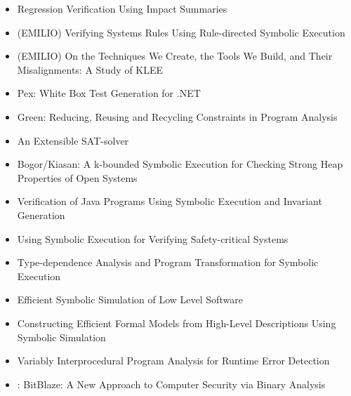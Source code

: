 \documentclass[10pt, a4paper]{article}
\begin{document}
\begin{itemize}
  \item \cite{BPR-SPIN13} Regression Verification Using Impact Summaries
  \item (EMILIO) \cite{CHW-ASPLOS13} Verifying Systems Rules Using Rule-directed Symbolic Execution
  \item \cite{RED-ICSE16} (EMILIO) On the Techniques We Create, the Tools We Build, and Their Misalignments: A Study of KLEE
  \item \cite{PEX-TAP08} Pex: White Box Test Generation for .NET
  \item \cite{VGD-FSE12} Green: Reducing, Reusing and Recycling Constraints in Program Analysis
  \item \cite{ES-SAT03} An Extensible SAT-solver
  \item \cite{DL-ASE06} Bogor/Kiasan: A k-bounded Symbolic Execution for Checking Strong Heap Properties of Open Systems
  \item \cite{PV-SPIN04} Verification of Java Programs Using Symbolic Execution and Invariant Generation
  \item \cite{PDG-FSE01} Using Symbolic Execution for Verifying Safety-critical Systems
  \item \cite{AOH-TACAS07} Type-dependence Analysis and Program Transformation for Symbolic Execution
  \item \cite{AEO-DATE08} Efficient Symbolic Simulation of Low Level Software
  \item \cite{KP-JPP05} Constructing Efficient Formal Models from High-Level Descriptions Using Symbolic Simulation
  \item \cite{TBV-ISSTA07} Variably Interprocedural Program Analysis for Runtime Error Detection
  \item \cite{BITBLAZE-ICISS08}: {BitBlaze}: A New Approach to Computer Security via Binary Analysis 
\end{itemize}
\end{document}
